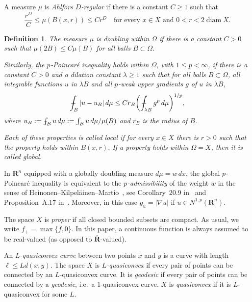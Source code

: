 \documentclass[a4paper,twoside]{article}
\theoremstyle{propositional}
\theoremstyle{descriptive}
\newtheorem{deff}[thm]{Definition}
\theoremstyle{remarkstyle}
\def\vint{\mathop{\mathchoice%
          {\setbox0\hbox{$\displaystyle\intop$}\kern 0.22\wd0%
           \vcenter{\hrule width 0.6\wd0}\kern -0.82\wd0}%
          {\setbox0\hbox{$\textstyle\intop$}\kern 0.2\wd0%
           \vcenter{\hrule width 0.6\wd0}\kern -0.8\wd0}%
          {\setbox0\hbox{$\scriptstyle\intop$}\kern 0.2\wd0%
           \vcenter{\hrule width 0.6\wd0}\kern -0.8\wd0}%
          {\setbox0\hbox{$\scriptscriptstyle\intop$}\kern 0.2\wd0%
           \vcenter{\hrule width 0.6\wd0}\kern -0.8\wd0}}%
          \mathopen{}\int}
\DeclareMathOperator{\diam}{diam}
\newcommand{\Om}{\Omega}
\newcommand{\la}{\lambda}
\newcommand{\p}{{$p\mspace{1mu}$}}
\newcommand{\R}{\mathbf{R}}
\newcommand{\eR}{{\overline{\R}}}
\newcommand{\Np}{N^{1,p}}
\numberwithin{equation}{section}
\begin{document}
A measure $\mu$ is \emph{Ahlfors $D$-regular} if there
is a constant $C \ge 1$ such that
\[
     \frac{r^D}{C} \le \mu(B(x,r)) \le Cr^D
\quad \text{for every $x \in X$ and $0 <r< 2 \diam X$}.
\]



\begin{deff} 
The measure $\mu$ is \emph{doubling within  $\Om$}
if there is a constant $C>0$  
such that $\mu(2B)\le C \mu(B)$ for all balls $B \subset \Om$.


Similarly, the
\emph{\p-Poincar\'e inequality holds within $\Om$}, with $1 \le p <\infty$,
if there is a constant $C>0$ and a \emph{dilation constant} $\lambda \ge 1$
such that for all balls $B\subset \Om$,
all integrable functions $u$ in $\la B$ and all 
\p-weak upper gradients $g$ of $u$ in $\la B$,
\begin{equation*} %
        \vint_{B} |u-u_B| \,d\mu
        \le C r_B \biggl( \vint_{\lambda B} g^{p} \,d\mu \biggr)^{1/p},
\end{equation*}
where $u_B:=\vint_B u \,d\mu := \int_B u\, d\mu/\mu(B)$
and $r_B$ is the radius of $B$.

Each of these properties is called \emph{local} if 
for every $x \in X$ there is $r>0$
such that the property holds within $B(x,r)$.
If a property holds within $\Om=X$, then it is called \emph{global}.
\end{deff}


In $\R^n$ equipped with a globally doubling measure $d\mu=w\,dx$, 
the global \p-Poincar\'e inequality 
is equivalent to the \emph{\p-admissibility} of the weight $w$ in the
sense of Hei\-no\-nen--Kil\-pe\-l\"ai\-nen--Martio~\cite{HeKiMa}, see
Corollary~20.9 in~\cite{HeKiMa}
and Proposition~A.17 in~\cite{BBbook}.
Moreover, in this case $g_u=|\nabla u|$ if $u \in \Np(\R^n)$.


The space $X$ is \emph{proper} if  
all closed bounded subsets are compact.
As usual, we write $f_+= \max\{f,0\}$.
In this  paper, a continuous function is always assumed
to be real-valued (as opposed to $\eR$-valued). 

An \emph{$L$-quasiconvex curve} between two points $x$ and $y$ is
a curve with length $\ell \le L d(x,y)$. 
The space $X$ is \emph{$L$-quasiconvex} if every pair of points
can be connected by an $L$-quasiconvex curve.
It is \emph{geodesic} if every pair of points
can be connected by a \emph{geodesic}, i.e.\ a  $1$-quasiconvex curve.
$X$ is \emph{quasiconvex} if it is $L$-quasiconvex for some $L$.
\end{document}
